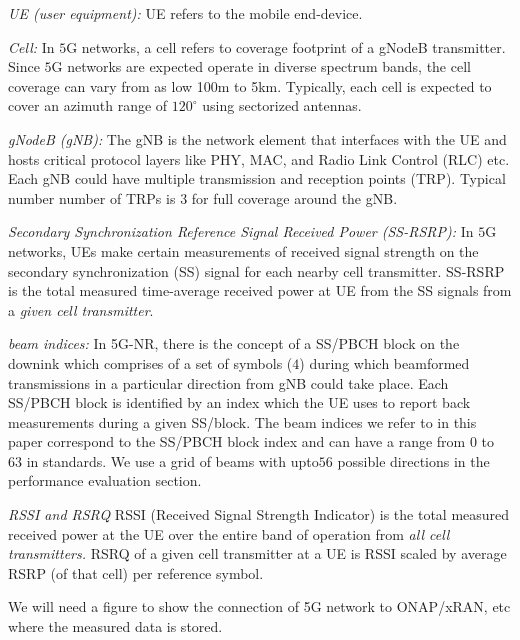 \documentclass[conference, 10pt]{IEEEtran}
\begin{document}
{\em UE (user equipment):} UE refers to the mobile end-device.

{\em Cell:} In $5$G networks, a cell refers to coverage footprint of a gNodeB transmitter. Since $5$G networks are expected operate in diverse spectrum bands, the cell coverage can vary from as low 100m to 5km. Typically, each cell is expected to cover an azimuth range of $120^\circ$ using sectorized antennas.

{\em gNodeB (gNB):} The gNB is the network element that interfaces with the UE and
hosts critical protocol layers like PHY, MAC, and Radio Link Control (RLC) etc. Each
gNB could have multiple transmission and reception points (TRP). Typical number number of TRPs is $3$ for full coverage around the gNB.

{\em Secondary Synchronization Reference Signal Received Power (SS-RSRP):} In $5$G networks, UEs make certain
measurements of received signal strength on the secondary synchronization (SS) signal for each nearby cell transmitter. SS-RSRP is
the total measured time-average received power at UE from the SS signals 
from a {\em given cell transmitter}. 

{\em beam indices:} In 5G-NR, there is the concept of a SS/PBCH block on the downink which comprises of a set of symbols ($4$) during which beamformed transmissions in a particular direction from gNB could take place. Each SS/PBCH block is identified by an index which the UE uses to report back measurements during a given SS/block. The beam indices we refer to in this paper correspond to the SS/PBCH block index and can have a range from $0$ to $63$ in standards. We use a grid of beams with upto$56$ possible directions in the performance evaluation section.  



{\em RSSI and RSRQ} RSSI (Received Signal Strength Indicator) is the total measured
received power at the UE over the entire band of operation from {\em all cell
transmitters.} RSRQ of a given cell transmitter at a UE is RSSI scaled by average
RSRP (of that cell) per reference symbol.

We will need a figure to show the connection of 5G network to ONAP/xRAN, etc where the measured 
data is stored.
\end{document}
